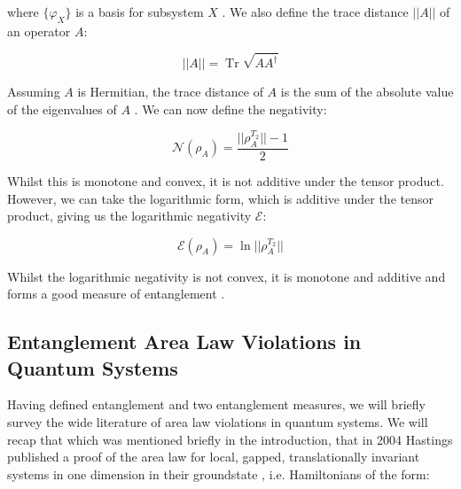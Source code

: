 where $\{\varphi_{X}\}$ is a basis for subsystem $X$ \cite{paola2016}. We also define the trace distance $||A||$ of an operator $A$:

\begin{equation}
	||A|| = \operatorname{Tr} \sqrt{A A^\dagger}
\end{equation}

Assuming $A$ is Hermitian, the trace distance of $A$ is the sum of the absolute value of the eigenvalues of $A$ \cite{paola_phd}. We can now define the negativity:

\begin{equation}\label{eq:negativity}
	 \mathcal{N}(\rho_A) = \frac{||\rho_A^{T_2}|| - 1}{2}
\end{equation}

 Whilst this is monotone and convex, it is not additive under the tensor product. However, we can take the logarithmic form, which is additive under the tensor product, giving us the logarithmic negativity $\mathcal{E}$:
 
\begin{equation}\label{eq:logneg}
	\mathcal{E}(\rho_A) = \ln{||\rho_A^{T_2}||}
\end{equation}


Whilst the logarithmic negativity is not convex, it is monotone and additive and forms a good measure of entanglement \cite{plenio_negativity}.

\subsection{Entanglement Area Law Violations in Quantum Systems}\label{subsec:area_law_violations}
Having defined entanglement and two entanglement measures, we will briefly survey the wide literature of area law violations in quantum systems. We will recap that which was mentioned briefly in the introduction, that in 2004 Hastings published a proof of the area law for local, gapped, translationally invariant systems in one dimension in their groundstate \cite{hastings_area_law}, i.e. Hamiltonians of the form:

